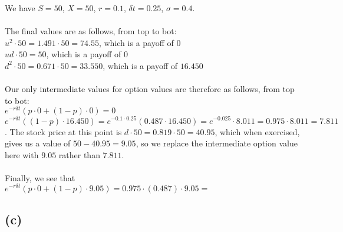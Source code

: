 \documentclass{article}
\begin{document}
{%
We have $S = 50$, $X = 50$, $r = 0.1$, $\delta t = 0.25$, $\sigma = 0.4$. \\ \\
The final values are as follows, from top to bot: \\
$u^2 \cdot 50 = 1.491 \cdot 50 = 74.55$, which is a payoff of $0$ \\
$ud \cdot 50 = 50$, which is a payoff of $0$ \\
$d^2 \cdot 50 = 0.671 \cdot 50 = 33.550$, which is a payoff of $16.450$ \\ \\
Our only intermediate values for option values are therefore as follows, from top to bot: \\
$e^{-r \delta t} (p \cdot 0 + (1-p) \cdot 0) = 0$ \\
$e^{-r \delta t} ((1-p) \cdot 16.450) = e^{-0.1 \cdot 0.25} (0.487 \cdot 16.450) = e^{-0.025} \cdot 8.011 = 0.975 \cdot 8.011 = 7.811$. The stock price at this point is $d \cdot 50 = 0.819 \cdot 50 = 40.95$, which when exercised, gives us a value of $50 - 40.95 = 9.05$, so we replace the intermediate option value here with $9.05$ rather than $7.811$. \\ \\
Finally, we see that \\
$e^{-r \delta t} (p \cdot 0 + (1-p) \cdot 9.05) = 0.975 \cdot (0.487) \cdot 9.05 = $ 

\subsection*{(c)}

}
\end{document}

